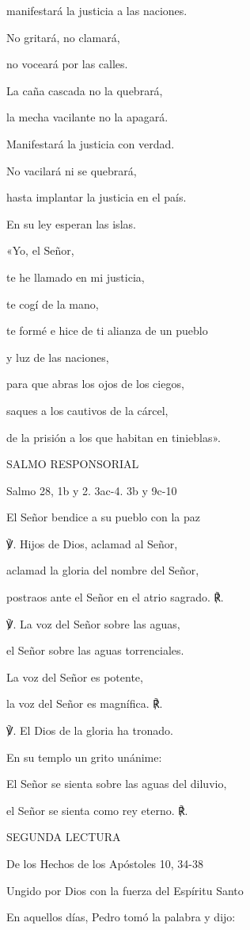 \begin{body}
\begin{body}
{manifestará la justicia a las naciones.

No gritará, no clamará,

no voceará por las calles.

La caña cascada no la quebrará,

la mecha vacilante no la apagará.

Manifestará la justicia con verdad.

No vacilará ni se quebrará,

hasta implantar la justicia en el país.

En su ley esperan las islas.

«Yo, el Señor,

te he llamado en mi justicia,

te cogí de la mano,

te formé e hice de ti alianza de un pueblo

y luz de las naciones,

para que abras los ojos de los ciegos,

saques a los cautivos de la cárcel,

de la prisión a los que habitan en tinieblas».

SALMO RESPONSORIAL

Salmo 28, 1b y 2. 3ac-4. 3b y 9c-10

El Señor bendice a su pueblo con la paz

℣. Hijos de Dios, aclamad al Señor,

aclamad la gloria del nombre del Señor,

postraos ante el Señor en el atrio sagrado. ℟.

℣. La voz del Señor sobre las aguas,

el Señor sobre las aguas torrenciales.

La voz del Señor es potente,

la voz del Señor es magnífica. ℟.

℣. El Dios de la gloria ha tronado.

En su templo un grito unánime: 

El Señor se sienta sobre las aguas del diluvio,

el Señor se sienta como rey eterno. ℟.

SEGUNDA LECTURA

De los Hechos de los Apóstoles 10, 34-38

Ungido por Dios con la fuerza del Espíritu Santo

En aquellos días, Pedro tomó la palabra y dijo:

}
\end{body}
\end{body}
